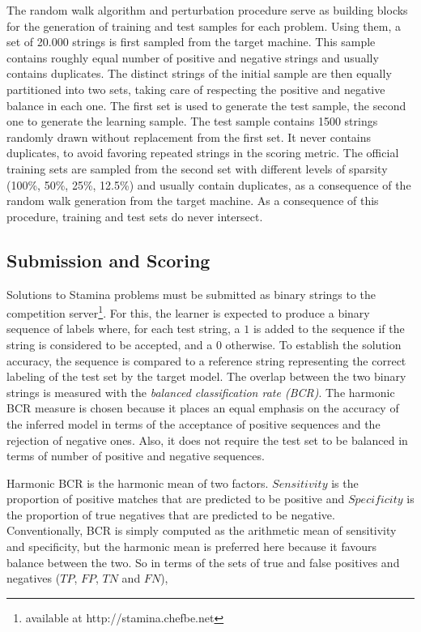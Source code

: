 The random walk algorithm and perturbation procedure serve as building blocks for the generation of training and test samples for each problem. Using them, a set of 20.000 strings is first sampled from the target machine. This sample contains roughly equal number of positive and negative strings and usually contains duplicates. The distinct strings of the initial sample are then equally partitioned into two sets, taking care of respecting the positive and negative balance in each one. The first set is used to generate the test sample, the second one to generate the learning sample. The test sample contains 1500 strings randomly drawn without replacement from the first set. It never contains duplicates, to avoid favoring repeated strings in the scoring metric. The official training sets are sampled from the second set with different levels of sparsity (100\%, 50\%, 25\%, 12.5\%) and usually contain duplicates, as a consequence of the random walk generation from the target machine. As a consequence of this procedure, training and test sets do never intersect.

\subsection{Submission and Scoring\label{subsection:stamina-scoring}}

Solutions to Stamina problems must be submitted as binary strings to the competition server\footnote{available at http://stamina.chefbe.net}. For this, the learner is expected to produce a binary sequence of labels where, for each test string, a $1$ is added to the sequence if the string is considered to be accepted, and a $0$ otherwise. To establish the solution accuracy, the sequence is compared to a reference string representing the correct labeling of the test set by the target model. The overlap between the two binary strings is measured with the \emph{balanced classification rate (BCR)}. The harmonic BCR measure is chosen because it places an equal emphasis on the accuracy of the inferred model in terms of the acceptance of positive sequences and the rejection of negative ones. Also, it does not require the test set to be balanced in terms of number of positive and negative sequences. 

Harmonic BCR is the harmonic mean of two factors. $Sensitivity$ is the proportion of positive matches that are predicted to be positive and $Specificity$ is the proportion of true negatives that are predicted to be negative. Conventionally, BCR is simply computed as the arithmetic mean of sensitivity and specificity, but the harmonic mean is preferred here because it favours balance between the two. So in terms of the sets of true and false positives and negatives ($TP$, $FP$, $TN$ and $FN$),

